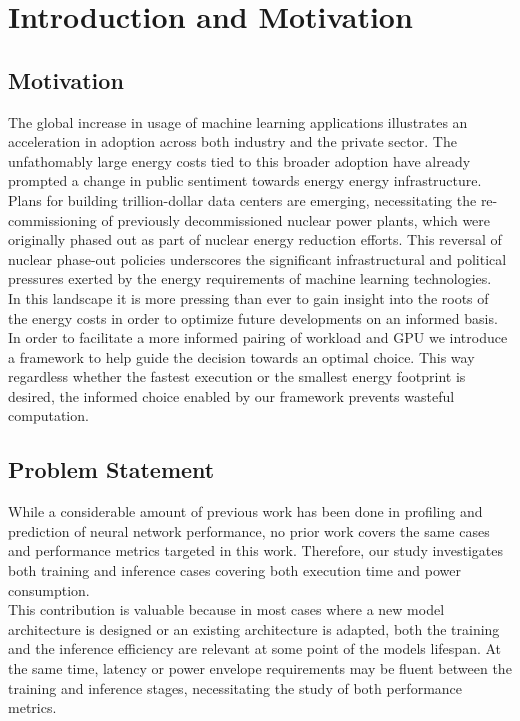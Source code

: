 \chapter{Introduction and Motivation}\label{chap:introduction}

\section{Motivation}

The global increase in usage of machine learning applications
 illustrates an acceleration in adoption across
both industry and the private sector. The unfathomably
large energy costs tied to this broader adoption have
already prompted a change in public sentiment towards
 energy energy infrastructure. Plans for building
trillion-dollar data centers are emerging, necessitating
the re-commissioning of previously decommissioned
nuclear power plants, which were originally phased
out as part of nuclear energy reduction efforts. This
reversal of nuclear phase-out policies underscores the
significant infrastructural and political pressures
exerted by the energy requirements of machine learning
technologies. \\
In this landscape it is more pressing than ever to gain
insight into the roots of the energy costs in order to
optimize future developments on an informed basis. \\
In order to facilitate a more informed pairing of workload 
and GPU we introduce a framework to help guide the decision 
towards an optimal choice. This way regardless whether 
the fastest execution or the smallest energy footprint is 
desired, the informed choice enabled by our framework
prevents wasteful computation.

\section{Problem Statement}
While a considerable amount of previous work has been done in
profiling and prediction of neural network performance, no prior
work covers the same cases and performance metrics targeted in this work.
Therefore, our study investigates both training and inference cases 
covering both execution time and power consumption. \\
This contribution is valuable because in most cases where a new model
architecture is designed or an existing architecture is adapted, 
both the training and the inference efficiency are relevant at some
point of the models lifespan. At the same time, latency or power 
envelope requirements may be fluent between the training and
inference stages, necessitating the study of both performance metrics.


